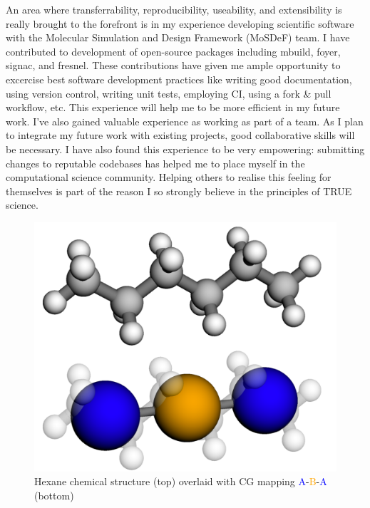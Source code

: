 An area where transferrability, reproducibility, useability, and extensibility is really brought to the forefront is in my experience developing scientific software with the Molecular Simulation and Design Framework (MoSDeF) team.
I have contributed to development of open-source packages including mbuild, foyer, signac, and fresnel\cite{mbuild, foyer, signac, fresnel}.
These contributions have given me ample opportunity to excercise best software development practices like writing good documentation, using version control, writing unit tests, employing CI, using a fork \& pull workflow, etc.
This experience will help me to be more efficient in my future work.
I've also gained valuable experience as working as part of a team.
As I plan to integrate my future work with existing projects, good collaborative skills will be necessary.
I have also found this experience to be very empowering: submitting changes to reputable codebases has helped me to place myself in the computational science community.
Helping others to realise this feeling for themselves is part of the reason I so strongly believe in the principles of TRUE science.

\begin{figure}
    \centering
    \includegraphics[width=\linewidth]{images/hexane-compare.pdf}
    \caption{Hexane chemical structure (top) overlaid with CG mapping \textcolor{blue}{A}-\textcolor{orange}{B}-\textcolor{blue}{A} (bottom)}\label{hexane}
\end{figure}

